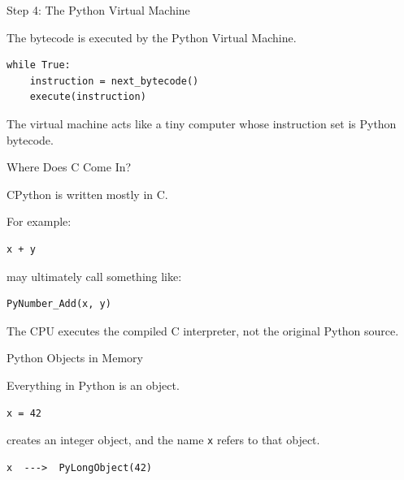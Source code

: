 \documentclass{beamer}
\begin{document}
\begin{frame}[fragile]{Step 4: The Python Virtual Machine}

The bytecode is executed by the Python Virtual Machine.

\begin{verbatim}
while True:
    instruction = next_bytecode()
    execute(instruction)
\end{verbatim}

The virtual machine acts like a tiny computer
whose instruction set is Python bytecode.

\end{frame}

\begin{frame}[fragile]{Where Does C Come In?}

CPython is written mostly in C.

For example:

\begin{verbatim}
x + y
\end{verbatim}

may ultimately call something like:

\begin{verbatim}
PyNumber_Add(x, y)
\end{verbatim}

The CPU executes the compiled C interpreter,
not the original Python source.

\end{frame}

\begin{frame}[fragile]{Python Objects in Memory}

Everything in Python is an object.

\begin{verbatim}
x = 42
\end{verbatim}

creates an integer object, and the name
\texttt{x} refers to that object.

\begin{verbatim}
x  --->  PyLongObject(42)
\end{verbatim}

\end{frame}
\end{document}
